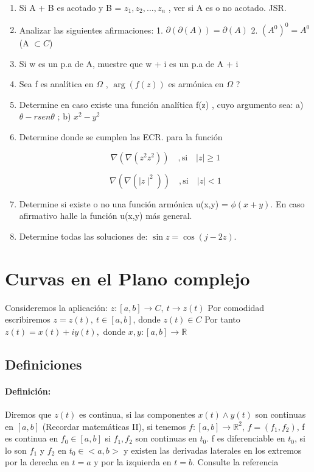 \documentclass[a4paper,12pt]{article}
\begin{document}
\begin{enumerate}
\item  Si A + B es acotado y B = { \(z_1, z_2, ..., z_n\) }, ver si A es o no acotado. JSR.

\item   Analizar las siguientes afirmaciones: 1. \(\partial(\partial(A)) = \partial(A)\) 2. \((A^0)^0 = A^0\) (A \(\subset C\))

\item  Si w es un p.a de A, muestre que w + i es un p.a de A + {i}

\item  Sea f es analítica en \(\Omega\) , \(\arg(f(z))\) es armónica en \(\Omega\) ?

\item   Determine en caso existe una función analítica f(z) , cuyo argumento sea: a) \(\theta - rsen\theta\) ; b) \(x^2 - y^2\)

\item   Determine donde se cumplen las ECR. para la función

\[ \nabla(\nabla(z^2z^2)) \quad , \text{si} \quad |z| \geq 1 \]

\[ \nabla(\nabla(\mid z \mid^2)) \quad , \text{si} \quad |z| < 1 \]

\item   Determine si existe o no una función armónica u(x,y) = \(\phi (x + y)\). En caso afirmativo halle la función u(x,y) más general.

\item  Determine todas las soluciones de: \(\sin z = \cos (j - 2z)\).


\end{enumerate}


\newpage
\section{Curvas en el Plano complejo}


Consideremos la aplicación: \( z : [a,b] \rightarrow C, \ t \rightarrow z(t) \)
Por comodidad escribiremos \( z = z(t), \ t \in [a,b] \), donde \( z(t) \in C \)
Por tanto \( z(t) = x(t) + iy(t), \) donde \( x, y : [a,b] \rightarrow \mathbb{R}\)

\subsection{Definiciones}
\paragraph{Definición:}
Diremos que \( z(t) \) es continua, si las componentes \( x(t) \wedge y(t) \) son continuas en \([a,b]\) (Recordar matemáticas II), si tenemos \( f : [a,b] \rightarrow \mathbb{R}^2 \), \( f = (f_1, f_2) \), f es continua en \( f_0 \in [a,b] \) si \( f_1, f_2 \) son continuas en \( t_0 \). f es diferenciable en \( t_0 \), si lo son \( f_1 \) y \( f_2 \) en \( t_0 \in <a,b> \) y existen las derivadas laterales en los extremos por la derecha en \( t = a \) y por la izquierda en \( t = b \). Consulte la referencia \cite{RojasCerna1995}
\end{document}
